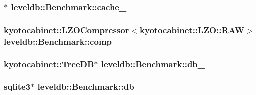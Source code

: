\subsubsection[{cache\+\_\+}]{$\ast$ leveldb\+::\+Benchmark\+::cache\+\_\+\hspace{0.3cm}{\ttfamily [private]}}\label{classleveldb_1_1_benchmark_af051c32dbe15c131de7cd273517b1dfb}
\hypertarget{classleveldb_1_1_benchmark_aa81b0851626974e65e302735393c937d}{}
\subsubsection[{comp\+\_\+}]{\setlength{\rightskip}{0pt plus 5cm}kyotocabinet\+::\+L\+Z\+O\+Compressor$<$kyotocabinet\+::\+L\+Z\+O\+::\+R\+A\+W$>$ leveldb\+::\+Benchmark\+::comp\+\_\+\hspace{0.3cm}{\ttfamily [private]}}\label{classleveldb_1_1_benchmark_aa81b0851626974e65e302735393c937d}
\hypertarget{classleveldb_1_1_benchmark_ac287bb1d708f5e4859ef6633f3769a0c}{}
\subsubsection[{db\+\_\+}]{\setlength{\rightskip}{0pt plus 5cm}kyotocabinet\+::\+Tree\+D\+B$\ast$ leveldb\+::\+Benchmark\+::db\+\_\+\hspace{0.3cm}{\ttfamily [private]}}\label{classleveldb_1_1_benchmark_ac287bb1d708f5e4859ef6633f3769a0c}
\hypertarget{classleveldb_1_1_benchmark_a409eeef97e94dddaf33d2185c7dd3ae1}{}
\subsubsection[{db\+\_\+}]{\setlength{\rightskip}{0pt plus 5cm}sqlite3$\ast$ leveldb\+::\+Benchmark\+::db\+\_\+\hspace{0.3cm}{\ttfamily [private]}}\label{classleveldb_1_1_benchmark_a409eeef97e94dddaf33d2185c7dd3ae1}
\hypertarget{classleveldb_1_1_benchmark_a8583f72650821d4141934eee12b20392}{}
